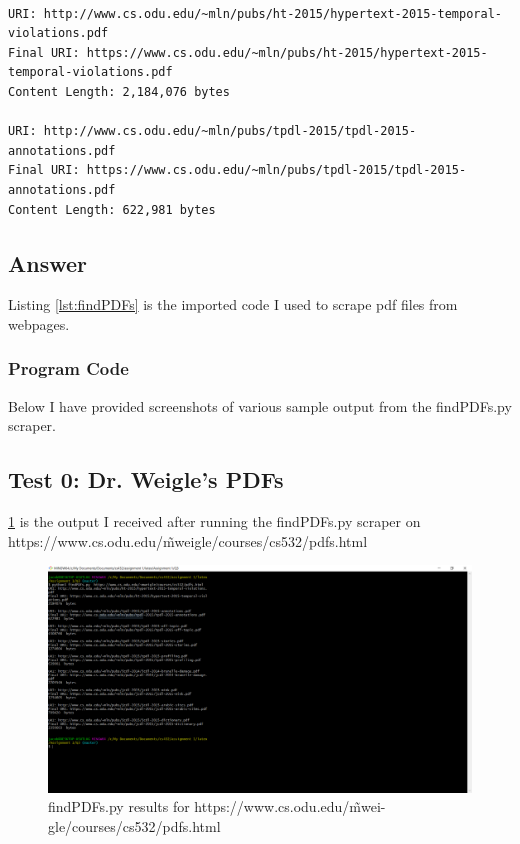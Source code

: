 \documentclass[12pt]{article}
\begin{document}
\begin{lstlisting}[numbers=none, caption=Expected Output, label=lst:q3ExpectedOutput]
% python3 findPDFs.py https://www.cs.odu.edu/~mweigle/courses/cs532/pdfs.html

URI: http://www.cs.odu.edu/~mln/pubs/ht-2015/hypertext-2015-temporal-violations.pdf
Final URI: https://www.cs.odu.edu/~mln/pubs/ht-2015/hypertext-2015-temporal-violations.pdf
Content Length: 2,184,076 bytes

URI: http://www.cs.odu.edu/~mln/pubs/tpdl-2015/tpdl-2015-annotations.pdf
Final URI: https://www.cs.odu.edu/~mln/pubs/tpdl-2015/tpdl-2015-annotations.pdf
Content Length: 622,981 bytes
\end{lstlisting}

\subsection*{Answer}
Listing \ref{lst:findPDFs} is the imported code I used to scrape pdf files from webpages.
\subsubsection*{Program Code}


Below I have provided screenshots of various sample output from the findPDFs.py scraper. 
\subsection*{Test 0: Dr. Weigle's PDFs} 

\ref{fig:q3ResponseWeigle} is the output I received after running the findPDFs.py scraper on https://www.cs.odu.edu/\~ mweigle/courses/cs532/pdfs.html 
\begin{figure}[H]
    \centering
    \includegraphics[trim=0 50 400 20, clip, width=\textwidth] {Q3/q3_weiglePdfs.png}
    \caption{findPDFs.py results for https://www.cs.odu.edu/\~ mwei-
gle/courses/cs532/pdfs.html}
    \label{fig:q3ResponseWeigle}
\end{figure}
\end{document}
